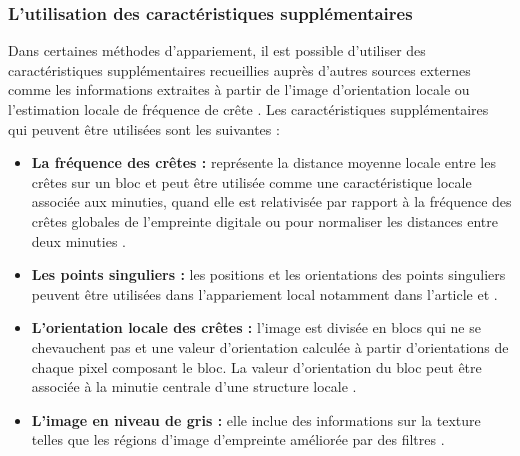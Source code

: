  \subsubsection{L’utilisation des caractéristiques supplémentaires}
 Dans certaines méthodes d'appariement, il est possible d'utiliser des caractéristiques supplémentaires recueillies auprès d'autres sources externes comme les informations extraites à partir de l'image d'orientation locale ou l'estimation locale de fréquence de crête \citep{Peralta2015a}. Les caractéristiques supplémentaires qui peuvent être utilisées sont les suivantes :
 \begin{itemize}
 	\item \textbf{La fréquence des crêtes : }représente la distance moyenne locale entre les crêtes sur un bloc et peut être utilisée comme une caractéristique locale associée aux minuties, quand elle est relativisée par rapport à la fréquence des crêtes globales de l'empreinte digitale ou pour normaliser les distances entre deux minuties \citep{chikkerur2007fingerprint}.
 	\item \textbf{Les points singuliers :} les positions et les orientations des points singuliers peuvent être utilisées dans l’appariement local notamment dans l’article \citep{zhang2002core} et \citep{feng2008combining}.
 	\item \textbf{L’orientation locale des crêtes :} l’image est divisée en blocs qui ne se chevauchent pas et une valeur d’orientation calculée à partir d’orientations de chaque pixel composant le bloc. La valeur d’orientation du bloc  peut être associée à la minutie centrale d'une structure locale \citep{maltoni2009handbook}. 
 	\item \textbf{L’image en niveau de gris :} elle inclue des informations sur la texture telles que les régions d'image d'empreinte améliorée par des filtres \citep{Peralta2015a}.
 \end{itemize}

